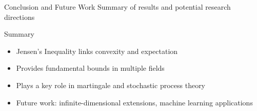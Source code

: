 \documentclass{beamer}
\begin{document}
\begin{frame}{Conclusion and Future Work}
Summary of results and potential research directions

\begin{block}{Summary}
\begin{itemize}
\item Jensen's Inequality links convexity and expectation
\item Provides fundamental bounds in multiple fields
\item Plays a key role in martingale and stochastic process theory
\item Future work: infinite-dimensional extensions, machine learning applications
\end{itemize}
\end{block}
\end{frame}
\end{document}

